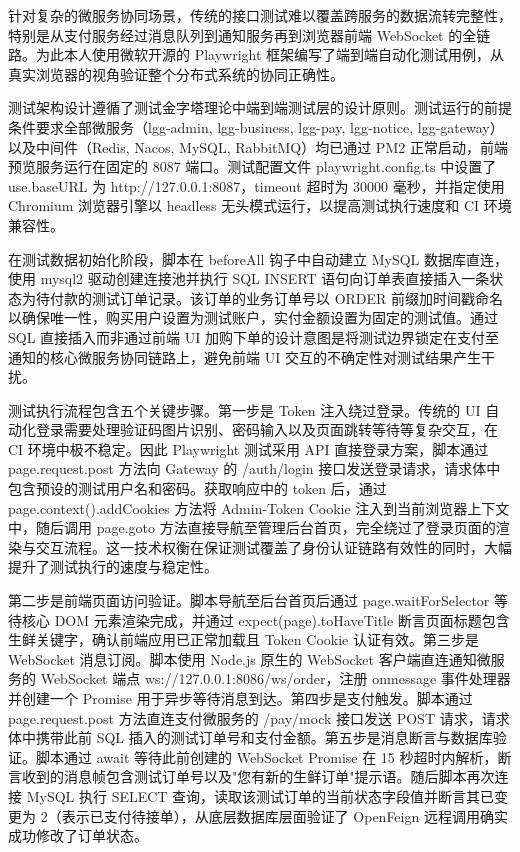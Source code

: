 针对复杂的微服务协同场景，传统的接口测试难以覆盖跨服务的数据流转完整性，特别是从支付服务经过消息队列到通知服务再到浏览器前端 WebSocket 的全链路。为此本人使用微软开源的 Playwright 框架编写了端到端自动化测试用例，从真实浏览器的视角验证整个分布式系统的协同正确性。

测试架构设计遵循了测试金字塔理论中端到端测试层的设计原则。测试运行的前提条件要求全部微服务（lgg-admin, lgg-business, lgg-pay, lgg-notice, lgg-gateway）以及中间件（Redis, Nacos, MySQL, RabbitMQ）均已通过 PM2 正常启动，前端预览服务运行在固定的 8087 端口。测试配置文件 playwright.config.ts 中设置了 use.baseURL 为 http://127.0.0.1:8087，timeout 超时为 30000 毫秒，并指定使用 Chromium 浏览器引擎以 headless 无头模式运行，以提高测试执行速度和 CI 环境兼容性。

在测试数据初始化阶段，脚本在 beforeAll 钩子中自动建立 MySQL 数据库直连，使用 mysql2 驱动创建连接池并执行 SQL INSERT 语句向订单表直接插入一条状态为待付款的测试订单记录。该订单的业务订单号以 ORDER 前缀加时间戳命名以确保唯一性，购买用户设置为测试账户，实付金额设置为固定的测试值。通过 SQL 直接插入而非通过前端 UI 加购下单的设计意图是将测试边界锁定在支付至通知的核心微服务协同链路上，避免前端 UI 交互的不确定性对测试结果产生干扰。

测试执行流程包含五个关键步骤。第一步是 Token 注入绕过登录。传统的 UI 自动化登录需要处理验证码图片识别、密码输入以及页面跳转等待等复杂交互，在 CI 环境中极不稳定。因此 Playwright 测试采用 API 直接登录方案，脚本通过 page.request.post 方法向 Gateway 的 /auth/login 接口发送登录请求，请求体中包含预设的测试用户名和密码。获取响应中的 token 后，通过 page.context().addCookies 方法将 Admin-Token Cookie 注入到当前浏览器上下文中，随后调用 page.goto 方法直接导航至管理后台首页，完全绕过了登录页面的渲染与交互流程。这一技术权衡在保证测试覆盖了身份认证链路有效性的同时，大幅提升了测试执行的速度与稳定性。

第二步是前端页面访问验证。脚本导航至后台首页后通过 page.waitForSelector 等待核心 DOM 元素渲染完成，并通过 expect(page).toHaveTitle 断言页面标题包含生鲜关键字，确认前端应用已正常加载且 Token Cookie 认证有效。第三步是 WebSocket 消息订阅。脚本使用 Node.js 原生的 WebSocket 客户端直连通知微服务的 WebSocket 端点 ws://127.0.0.1:8086/ws/order，注册 onmessage 事件处理器并创建一个 Promise 用于异步等待消息到达。第四步是支付触发。脚本通过 page.request.post 方法直连支付微服务的 /pay/mock 接口发送 POST 请求，请求体中携带此前 SQL 插入的测试订单号和支付金额。第五步是消息断言与数据库验证。脚本通过 await 等待此前创建的 WebSocket Promise 在 15 秒超时内解析，断言收到的消息帧包含测试订单号以及"您有新的生鲜订单"提示语。随后脚本再次连接 MySQL 执行 SELECT 查询，读取该测试订单的当前状态字段值并断言其已变更为 2（表示已支付待接单），从底层数据库层面验证了 OpenFeign 远程调用确实成功修改了订单状态。

